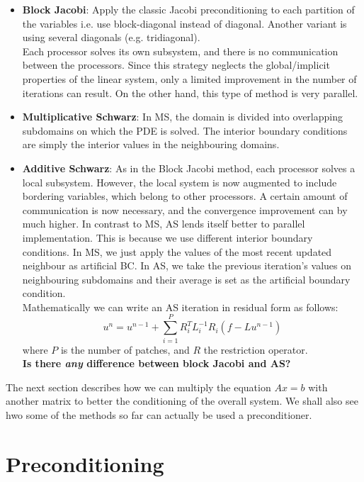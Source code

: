 \begin{itemize}
\item \textbf{Block Jacobi}: Apply the classic Jacobi preconditioning to each partition of the variables i.e. use block-diagonal instead of diagonal.
Another variant is using several diagonals (e.g. tridiagonal).\\
Each processor solves its own subsystem, and there is no communication between the processors. Since this strategy neglects the global/implicit properties of the linear system, only a limited improvement in the number of iterations can result. On the other hand, this type of method is very parallel.
\item \textbf{Multiplicative Schwarz}: In MS, the domain is divided into overlapping subdomains on which the PDE is solved. The interior boundary conditions are
simply the interior values in the neighbouring domains.
\item \textbf{Additive Schwarz}: %
As in the Block Jacobi method, each processor solves a local subsystem. However, the local system is now augmented to include bordering variables, which belong to other processors. A certain amount of communication is now necessary, and the convergence improvement can by much higher. In contrast to MS, AS lends itself better to parallel implementation. This is because we use different interior boundary conditions. In MS, we
just apply the values of the most recent updated neighbour as artificial BC. In AS, we take the previous iteration's values on neighbouring subdomains and their average
is set as the artificial boundary condition.\\

Mathematically we can write an AS iteration in residual form as follows:
\[
u^n = u^{n-1} + \sum_{i=1}^P R^T_i L^{-1}_i R_i (f - L u^{n-1})
\]
where $P$ is the number of patches, and $R$ the restriction operator.\\

\textbf{Is there \emph{any} difference between block Jacobi and AS?}
\end{itemize}

The next section describes how we can multiply the equation $Ax=b$ with another matrix to better the
conditioning of the overall system. We shall also see hwo some of the methods so far can actually
be used a preconditioner.

\section{Preconditioning}

